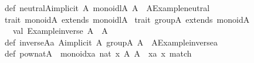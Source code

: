 \begin{isabellebody}
\begin{isamarkuptext}
{}\isanewline
def\ neutral{}A{}{}implicit\ A{}\ monoidl{}A{}{}{}\ A\ {}\ A{}{}Example{}neutral{}\isanewline
\isanewline
trait\ monoid{}A{}\ extends\ monoidl{}A{}\ {}\isanewline
{}\isanewline
\isanewline
trait\ group{}A{}\ extends\ monoid{}A{}\ {}\isanewline
\ \ val\ {}Example{}inverse{}{}\ A\ {}{}\ A\isanewline
{}\isanewline
def\ inverse{}A{}{}a{}\ A{}{}implicit\ A{}\ group{}A{}{}{}\ A\ {}\ A{}{}Example{}inverse{}{}a{}\isanewline
\isanewline
def\ pow{}nat{}A\ {}\ monoid{}{}xa{}{}\ nat{}\ x{}\ A{}{}\ A\ {}\ {}xa{}{}\ x{}\ match\ {}\isanewline

\end{isamarkuptext}
\end{isabellebody}
